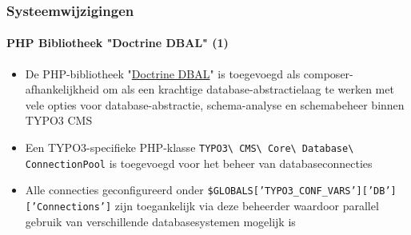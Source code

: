 \begin{frame}[fragile]
	\frametitle{Systeemwijzigingen}
	\framesubtitle{PHP Bibliotheek "Doctrine DBAL" (1)}

	\begin{itemize}

		\item De PHP-bibliotheek
			"\href{http://www.doctrine-project.org}{Doctrine DBAL}"
			is toegevoegd als composer-afhankelijkheid
			om als een krachtige database-abstractielaag te werken met vele opties
			voor database-abstractie, schema-analyse en schemabeheer binnen
			TYPO3 CMS

		\item Een TYPO3-specifieke PHP-klasse
			\texttt{TYPO3\textbackslash
				CMS\textbackslash
				Core\textbackslash
				Database\textbackslash
				ConnectionPool}\newline
			is toegevoegd voor het beheer van databaseconnecties

		\item Alle connecties geconfigureerd onder
			\texttt{\$GLOBALS['TYPO3\_CONF\_VARS']['DB']['Connections']}\newline
			zijn toegankelijk via deze beheerder waardoor parallel gebruik van
			verschillende databasesystemen mogelijk is

	\end{itemize}

\end{frame}


